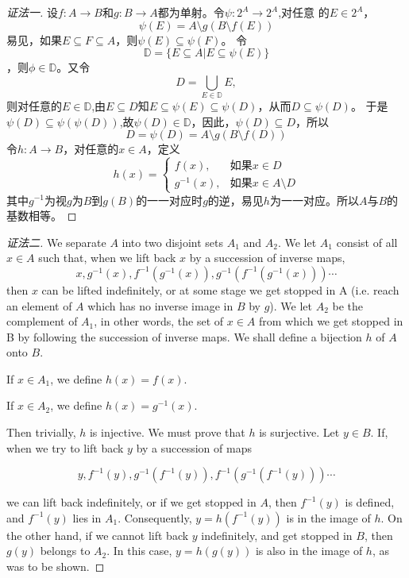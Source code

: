 \documentclass{article}
\begin{document}
\begin{CJK*}{UTF8}{gbsn}
  \begin{proof}[证法一]
    设$f:A\to B$和$g:B\to A$都为单射。令$\psi:2^A\to 2^A$,对任意
    的$E\in 2^A$，\[\psi(E)=A\setminus g(B\setminus f(E))\]易见，如果$E\subseteq F\subseteq A$，则$\psi(E)\subseteq \psi(F)$。
    令\[\mathbb{D}=\{E\subseteq A|E\subseteq \psi(E)\}\]，则$\phi\in \mathbb{D}$。又令
    \[D=\bigcup_{E\in \mathbb{D}}E,\]
    则对任意的$E\in \mathbb{D}$,由$E\subseteq D$知$E\subseteq \psi(E) \subseteq \psi(D)$，从而$D\subseteq \psi(D)$。
    于是$\psi(D)\subseteq \psi(\psi(D))$,故$\psi(D)\in \mathbb{D}$，因此，$\psi(D)\subseteq D$，所以
    \[D=\psi(D)=A\setminus g(B\setminus f(D))\]
    令$h:A\to B$，对任意的$x\in A$，定义
    \[h(x)=\begin{cases}
        f(x),&\text{如果}x\in D\\
        g^{-1}(x),&\text{如果}x\in A\setminus D
      \end{cases}
    \]
    其中$g^{-1}$为视$g$为$B$到$g(B)$的一一对应时$g$的逆，易见$h$为一一对应。所以$A$与$B$的基数相等。
  \end{proof}

  \begin{proof}[证法二]
     We separate $A$ into two disjoint sets $A_1$ and $A_2$. We let $A_1$ consist of all $x\in A$ such that, when we lift back $x$ by a succession of inverse maps,
    \[x, g^{-1}(x), f^{-1}(g^{-1}(x)),g^{-1}(f^{-1}(g^{-1}(x)))\cdots\]
    then $x$ can be lifted indefinitely, or  at some stage we get stopped in A (i.e. reach an element of $A$ which has no inverse image in $B$ by $g$). We let $A_2$ be the complement of $A_1$, in other words, the set of $x\in A$ from which we get stopped in B by following the succession of inverse maps. We shall define a bijection $h$ of $A$ onto $B$.

    If $x\in A_1$, we define $h(x)=f(x)$.

    If $x\in A_2$, we define $h(x)=g^{-1}(x)$.

    Then trivially, $h$ is injective. We must prove that $h$ is surjective. Let $y\in B$. If, when we try to lift back $y$ by a succession of maps

    \[y, f^{-1}(y), g^{-1}(f^{-1}(y)),f^{-1}(g^{-1}(f^{-1}(y)))\cdots\]
    
    we can lift back indefinitely, or if we get stopped in $A$, then $f^{-1}(y)$ is defined, and $f^{-1}(y)$ lies in $A_1$. Consequently, $y = h(f^{-1}(y))$ is in the image of $h$. On the other hand, if we cannot lift back $y$ indefinitely, and get stopped in $B$, then $g(y)$ belongs to $A_2$. In this case, $y=h(g(y))$ is also in the image of $h$, as was to be shown.


\end{proof}
\end{CJK*}
\end{document}
